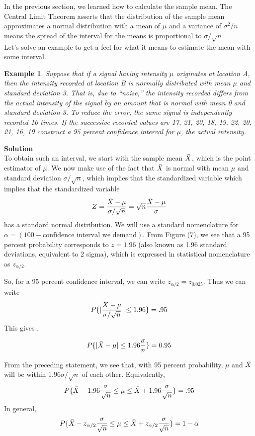 \documentclass[12pt,a4paper]{article}
\theoremstyle{example}
\newtheorem{example}{Example}
\theoremstyle{definition}
\theoremstyle{theorem}
\begin{document}
In the previous section, we learned how to calculate the sample mean. The Central Limit Theorem asserts that the distribution of the sample mean approximates a normal distribution with a mean of $\mu$ and a variance of $\sigma^2/n$ means  the spread of the interval for the means is proportional to $\sigma/\sqrt{n}$\\ 
Let's solve an example to get a feel for what it means to estimate the mean with some interval.\\
\begin{example}
    Suppose that if a signal having intensity $\mu$ originates at location A, then the
intensity recorded at location B is normally distributed with mean $\mu$ and
standard deviation 3. That is, due to “noise,” the intensity recorded differs
from the actual intensity of the signal by an amount that is normal with
mean 0 and standard deviation 3. To reduce the error, the same signal is
independently recorded 10 times. If the successive recorded values are
17, 21, 20, 18, 19, 22, 20, 21, 16, 19
construct a 95 percent confidence interval for $\mu$, the actual intensity.
\end{example}
\textbf{Solution}\\
To obtain
such an interval, we start with the sample mean $\Bar{X}$, which is the point estimator
of $\mu$. We now make use of the fact that $\Bar{X}$ is normal with mean $\mu$ and standard 
deviation $\sigma/\sqrt{n}$, which implies that the standardized variable which implies that the standardized variable
$$Z=\frac{\Bar{X}-\mu}{\sigma/\sqrt{n}}=\sqrt{n}\frac{\Bar{X}-\mu}{\sigma}$$ has a standard normal distribution. 
We will use a standard nomenclature for $\alpha = (100 - \text{confidence interval we demand})$. From Figure (7), we see that a 95 percent probability corresponds to $z = 1.96$ (also known as 1.96 standard deviations, equivalent to 2 sigma), which is expressed in statistical nomenclature as $z_{\alpha/2}$.

So, for a 95 percent confidence interval, we can write $z_{\alpha/2} = z_{0.025}$.
Thus we can write
\begin{equation}
    P\{|\frac{\Bar{X}-\mu}{\sigma/\sqrt{n}} |\leq1.96\}=.95
\end{equation}
This gives , 

\begin{equation}
    P\{|\Bar{X}-\mu| \leq 1.96 \frac{\sigma}{n}\}=0.95
\end{equation}
    
From the preceding statement, we see that, with 95 percent probability, $\mu$ and $\Bar{X}$ will be within $1.96\sigma/\sqrt{n}$ of each other. Equivalently,
\begin{equation}
    P\{\Bar{X}-1.96 \frac{\sigma}{\sqrt{n}} \leq \mu \leq \Bar{X}+1.96 \frac{\sigma}{\sqrt{n}}\}=.95
\end{equation}
In general, 
\begin{equation}\label{noramlXFalls}
    P\{\Bar{X}-z_{\alpha/2} \frac{\sigma}{\sqrt{n}} \leq \mu \leq \Bar{X}+z_{\alpha/2}\frac{\sigma}{\sqrt{n}}\}= 1-\alpha
\end{equation}
\end{document}
